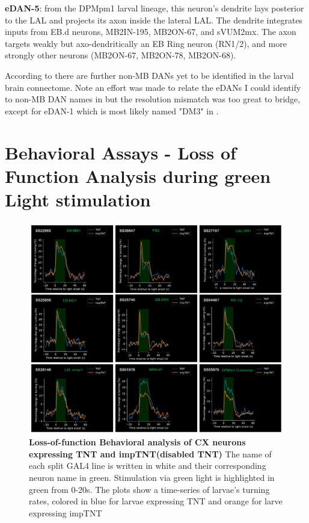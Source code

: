 \textbf{eDAN-5}: from the DPMpm1 larval lineage, this neuron's dendrite lays posterior to the LAL and projects its axon inside the lateral LAL. The dendrite integrates inputs from EB.d neurons, MB2IN-195, MB2ON-67, and sVUM2mx. The axon targets weakly but axo-dendritically an EB Ring neuron (RN1/2), and more strongly other neurons (MB2ON-67, MB2ON-78, MB2ON-68).

According to \citep{selcho2009thgal4} there are further non-MB DANs yet to be identified in the larval brain connectome. Note an effort was made to relate the eDANs I could identify to non-MB DAN names in \citep{selcho2009thgal4} but the resolution mismatch was too great to bridge, except for eDAN-1 which is most likely named "DM3" in \citep{selcho2009thgal4}.


\section{Behavioral Assays - Loss of Function Analysis during green Light stimulation}
    \begin{figure}
        \centering
        \includegraphics[width=12cm]{Figs/CX/BehaviourAssays.pdf}
        \caption[Loss of Function Analysis during Light Stimulation]{\textbf{Loss-of-function Behavioral analysis of CX neurons expressing TNT and impTNT(disabled TNT)} The name of each split GAL4 line is written in white and their corresponding neuron name in green. Stimulation via green light is highlighted in green from 0-20s. The plots show a time-series of larvae's turning rates, colored in blue for larvae expressing TNT and orange for larve expressing impTNT}
        \label{LOS}
    \end{figure}

